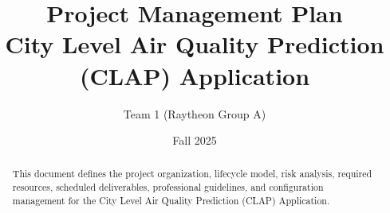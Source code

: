 \documentclass[11pt]{article}
\title{\textbf{Project Management Plan}\\[2pt]\large City Level Air Quality Prediction (CLAP) Application}
\author{Team 1 (Raytheon Group A)}
\date{Fall 2025}
\begin{document}
\maketitle

\begin{abstract}
This document defines the project organization, lifecycle model, risk analysis, required resources, scheduled deliverables, professional guidelines, and configuration management for the City Level Air Quality Prediction (CLAP) Application.
\end{abstract}

\tableofcontents
\newpage











\end{document}
